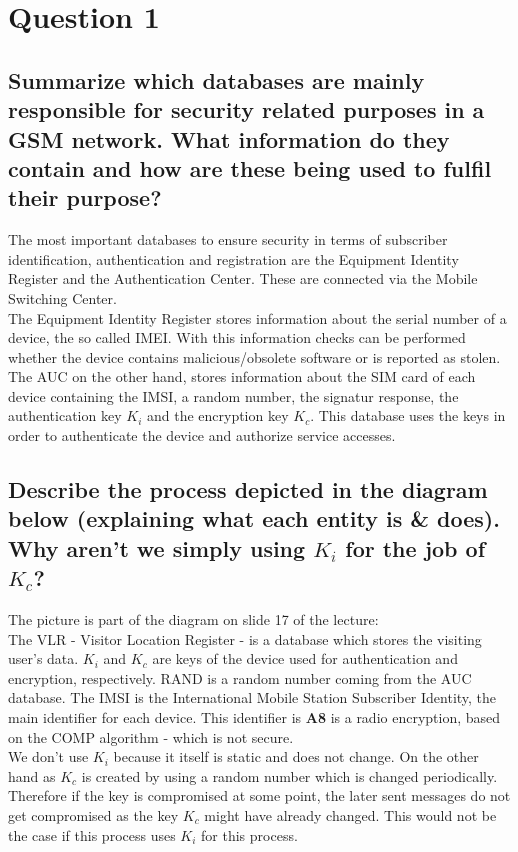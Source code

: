 \documentclass{report}
\begin{document}
	\section{Question 1}
	\startsection
		\renewcommand{\thesubsection}{\thesection.\Alph{subsection}}
		\subsection{Summarize which databases are mainly responsible for security related purposes in a GSM network. What information do they contain and how are these being used to fulfil their purpose?}
		\startsubsection
			The most important databases to ensure security in terms of subscriber identification, authentication and registration are the Equipment Identity Register and the Authentication Center. These are connected via the Mobile Switching Center. \\
			The Equipment Identity Register stores information about the serial number of a device, the so called IMEI. With this information checks can be performed whether the device contains malicious/obsolete software or is reported as stolen. \\
			The AUC on the other hand, stores information about the SIM card of each device containing the IMSI, a random number, the signatur response, the authentication key $K_i$ and the encryption key $K_c$. This database uses the keys in order to authenticate the device and authorize service accesses.
		\closesection
		\subsection{Describe the process depicted in the diagram below (explaining what each entity is \&
does). Why aren't we simply using $K_i$ for the job of $K_c$?}
		\startsubsection
			The picture is part of the diagram on slide 17 of the lecture: \\
			The VLR - Visitor Location Register - is a database which stores the visiting user's data. $K_i$ and $K_c$ are keys of the device used for authentication and encryption, respectively. RAND is a random number coming from the AUC database. The IMSI is the International Mobile Station Subscriber Identity, the main identifier for each device. This identifier is \textbf{A8} is a radio encryption, based on the COMP algorithm - which is not secure. \\
			We don't use $K_i$ because it itself is static and does not change. On the other hand as $K_c$ is created by using a random number which is changed periodically. Therefore if the key is compromised at some point, the later sent messages do not get compromised as the key $K_c$ might have already changed. This would not be the case if this process uses $K_i$ for this process.
		\closesection
	\closesection
\end{document}
